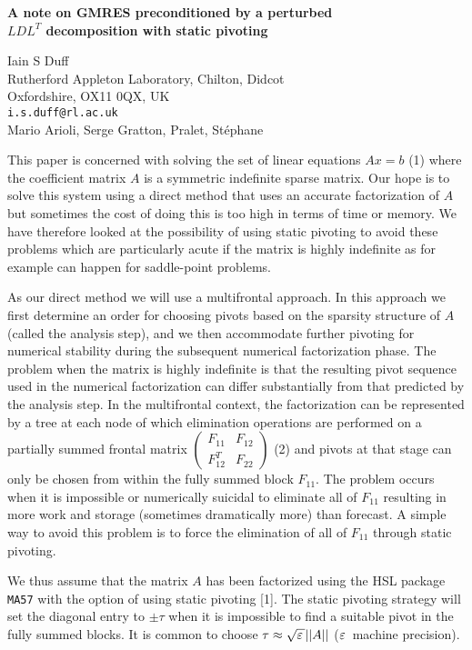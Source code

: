 \documentclass{report}
\newcommand{\Matrr}[4]{ \left(
	\begin{array}{cc}
	#1 & #2 \\
	#3 & #4
	\end{array}
	\right) }
\begin{document}

\begin{center}
{\large
{\bf A note on GMRES preconditioned by a perturbed \\
$LDL^T$ decomposition with static pivoting}}

	Iain S Duff \\
	Rutherford Appleton Laboratory, Chilton, Didcot \\
	Oxfordshire, OX11 0QX, UK \\
	{\tt i.s.duff@rl.ac.uk} \\
	Mario Arioli, Serge Gratton, Pralet, St\'ephane
\end{center}
This paper is concerned with solving the set of linear
equations $A x = b$ (1)
where the coefficient matrix $A$ is a
symmetric indefinite sparse matrix. Our hope is to solve
this system using a direct method that uses an accurate
factorization of $A$ but sometimes the cost of doing this is
too high in terms of time or memory. We have therefore
looked at the possibility of using static pivoting to avoid
these problems which are particularly acute if the matrix is
highly indefinite as for example can happen for saddle-point
problems.

As our direct method we will use a multifrontal
approach. In this approach we first determine an order for
choosing pivots based on the sparsity structure of $A$
(called the analysis step), and we then accommodate further
pivoting for numerical stability during the subsequent
numerical factorization phase. The problem when the matrix
is highly indefinite is that the resulting pivot sequence
used in the numerical factorization can differ substantially
from that predicted by the analysis step. In the
multifrontal context, the factorization can be represented
by a tree at each node of which elimination operations are
performed on a partially summed frontal matrix
$\Matrr{F_{11}}{F_{12}}{F_{12}^T}{F_{22}}$ (2)
and pivots at that stage can only
be chosen from within the fully summed block $F_{11}$. The
problem occurs when it is impossible or numerically suicidal
to eliminate all of $F_{11}$ resulting in more work and
storage (sometimes dramatically more) than forecast. A
simple way to avoid this problem is to force the elimination
of all of $F_{11}$ through static pivoting.

We thus
assume that the matrix $A$ has been factorized using the HSL
package {\tt MA57} with the option of using static pivoting
[1]. The static pivoting strategy will set the
diagonal entry to $\pm\tau$ when it is impossible to find a
suitable pivot in the fully summed blocks. It is common to
choose $\tau \approx \sqrt{{{\bf \varepsilon }\,}} ||A||$
(${{\bf \varepsilon }\,}$ machine precision).
\end{document}
